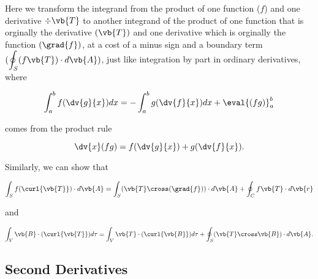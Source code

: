 \documentclass[english,a4paper,12pt]{report}
\begin{document}
Here we transform the integrand from the product of one function (\(f\)) and one derivative \(\div{\vb{T}}\) to another integrand of the product of one function that is orginally the derivative \((\vb{T})\) and one derivative which is orginally the function \((\grad{f})\), at a cost of a minus sign and a boundary term \(\displaystyle (\oint_{S} (f\vb{T}) \cdot d\vb{A})\), just like integration by part in ordinary derivatives, where
	
\begin{equation} 
	\int_{a}^{b} f(\dv{g}{x})dx = -\int_{a}^{b} g(\dv{f}{x})dx + \eval{(fg)}_a^b 
\end{equation}
	
comes from the product rule
	
\begin{equation} 
	\dv{x}(fg) = f(\dv{g}{x}) + g(\dv{f}{x}). 
\end{equation}

Similarly, we can show that 
	
\begin{equation} 
	\int_{S} f(\curl{\vb{T}}) \cdot d\vb{A} = \int_{S} (\vb{T} \cross (\grad{f})) \cdot d\vb{A} + \oint_{C} f\vb{T} \cdot d\vb{r} 
\end{equation}
	
and

\begin{equation} 
	\int_{V} \vb{B} \cdot (\curl{\vb{T}}) d\tau = \int_{V} \vb{T} \cdot (\curl{\vb{B}}) d\tau + \oint_{S} (\vb{T} \cross \vb{B}) \cdot d\vb{A}. 
\end{equation}
	
\subsection{Second Derivatives}
	
\end{document}
